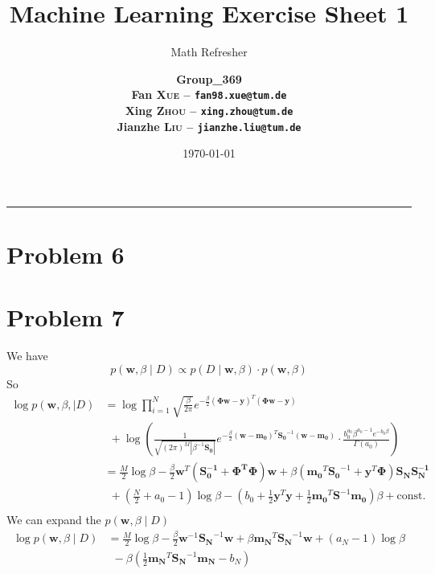 \documentclass[12pt]{scrartcl}
\title{\large Machine Learning Exercise Sheet 1}
\subtitle{\Large Math Refresher}
\author{\large\bfseries Group\_369 \\
        \large Fan \textsc{Xue} -- \texttt{fan98.xue@tum.de} \\
        \large Xing \textsc{Zhou} -- \texttt{xing.zhou@tum.de} \\
        \large Jianzhe \textsc{Liu} -- \texttt{jianzhe.liu@tum.de}}
\date{\large \today}
\begin{document}
  \maketitle
  \vspace{-1cm}
  \noindent\rule{\textwidth}{0.4pt}
  \section*{Problem 6}
  \section*{Problem 7}
  We have \[
  p\left( \boldsymbol{w}, \beta   \mid D \right) \propto p\left( D  \mid \boldsymbol{w}, \beta \right)  \cdot p\left( \boldsymbol{w}, \beta \right) 
  \] 
  So \[
      \begin{split}
          \log p\left( \boldsymbol{w}, \beta,  \mid D \right) &= \log \prod_{i=1}^{N} \sqrt{\frac{\beta}{2\pi}}e^{-\frac{\beta}{2}\left( \boldsymbol{\Phi w} - \boldsymbol{y} \right) ^{T}\left( \boldsymbol{\Phi w} - \boldsymbol{y} \right)  } \\ 
 &\ \ + \log \left( \frac{1}{\sqrt{\left( 2\pi \right) ^{M}|\beta^{-1}\boldsymbol{S_0} |} }e ^{-\frac{\beta}{2} \left( \boldsymbol{w} - \boldsymbol{m_0} \right)^{T} \boldsymbol{S_0}^{-1}\left(\boldsymbol{w} - \boldsymbol{m_0}\right) } \cdot \frac{b_0^{a_0}\beta^{a_0-1}e ^{-b_0\beta} }{\Gamma (a_0)}  \right)   \\
 &=  \frac{M}{2}\log\beta - \frac{\beta}{2}\boldsymbol{w}^{T}\left( \boldsymbol{S_0^{-1} + \boldsymbol{\Phi}^{T}\boldsymbol{\Phi}} \right) \boldsymbol{w} + \beta\left( \boldsymbol{m_0}^{T}\boldsymbol{S_0}^{-1}+\boldsymbol{y}^{T}\boldsymbol{\Phi}\right) \boldsymbol{S_NS_N^{-1}}    \\
 &\ \ + \left( \frac{N}{2} + a_0 - 1 \right) \log \beta - \left( b_0+\frac{1}{2}\boldsymbol{y}^{T}\boldsymbol{y} + \frac{1}{2}\boldsymbol{m_0}^{T}\boldsymbol{S}^{-1}\boldsymbol{m_0} \right) \beta + \text{const}. \\
      \end{split}
      \]
We can expand the $p\left( \boldsymbol{w}, \beta  \mid D \right) $\[
    \begin{split}
        \log p\left( \boldsymbol{w}, \beta  \mid  D \right) &= \frac{M}{2}\log \beta - \frac{\beta}{2}\boldsymbol{w}^{-1}\boldsymbol{S_N}^{-1}\boldsymbol{w} + \beta \boldsymbol{m_N}^{T}\boldsymbol{S_N}^{-1}\boldsymbol{w}+ \left( a_N - 1 \right)\log \beta \\ 
&\ \ - \beta\left( \frac{1}{2}\boldsymbol{m_N}^{T}\boldsymbol{S_N}^{-1}\boldsymbol{m_N} - b_N \right) \\ 
    \end{split}
\] 
\end{document}
